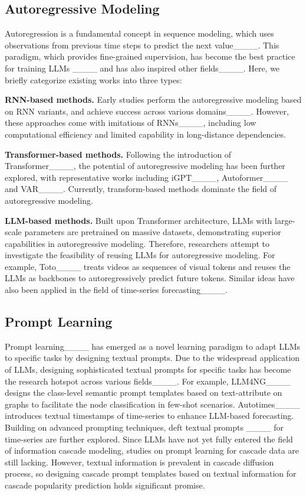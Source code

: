 \subsection{Autoregressive Modeling}
    Autoregression is a fundamental concept in sequence modeling, which uses observations from previous time steps to predict the next value____.
    This paradigm, which provides fine-grained supervision, has become the best practice for training LLMs ____ and has also inspired other fields____.
    Here, we briefly categorize existing works into three types:
    
    \noindent \textbf{RNN-based methods.}
    Early studies perform the autoregressive modeling based on RNN variants, and achieve success across various domains____.
    However, these approaches come with imitations of RNNs____, including low computational efficiency and limited capability in long-distance dependencies.
    
    \noindent \textbf{Transformer-based methods.}
    Following the introduction of Transformer____, the potential of autoregressive modeling has been further explored, with representative works including iGPT____, Autoformer____ and VAR____.
    Currently, transform-based methods dominate the field of autoregressive modeling.
    
    \noindent \textbf{LLM-based methods.}
    Built upon Transformer architecture, LLMs with large-scale parameters are pretrained on massive datasets, demonstrating superior capabilities in autoregressive modeling.
    Therefore, researchers attempt to investigate the feasibility of reusing LLMs for autoregressive modeling.
    For example, Toto____ treats videos as sequences of visual tokens and reuses the LLMs as backbones to autoregressively predict future tokens.
    Similar ideas have also been applied in the field of time-series forecasting____.

\subsection{Prompt Learning}
    Prompt learning____ has emerged as a novel learning paradigm to adapt LLMs to specific tasks by designing textual prompts.
    Due to the widespread application of LLMs, designing sophisticated textual prompts for specific tasks has become the research hotspot across various fields____.
    For example, 
    LLM4NG____ designs the class-level semantic prompt templates based on text-attribute on graphs to facilitate the node classification in few-shot scenarios.
    Autotimes____  introduces textual timestamps of time-series to enhance LLM-based forecasting.
    Building on advanced prompting techniques, deft textual prompts ____ for time-series are further explored.
    Since LLMs have not yet fully entered the field of information cascade modeling, studies on prompt learning for cascade data are still lacking. 
    However, textual information is prevalent in cascade diffusion process, so designing cascade prompt templates based on textual information for cascade popularity prediction holds significant promise.